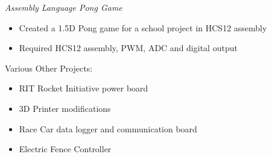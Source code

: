 \documentclass[line,mmmargin]{res}
\begin{document}
\begin{resume}
	\vspace{-10pt}
	{\sl Assembly Language Pong Game}
		\begin{itemize} \itemsep -2pt
			\item Created a 1.5D Pong game for a school project in HCS12 assembly
			\item Required HCS12 assembly, PWM, ADC and digital output
		\end{itemize}
	\vspace{-10pt}
	{Various Other Projects:}
		\begin{multicols}{2}
			\begin{itemize}
				\itemsep -2pt
				\item[] RIT Rocket Initiative power board
				\item[] 3D Printer modifications
				\item[] Race Car data logger and communication board
				\item[] Electric Fence Controller
			\end{itemize}
		\end{multicols}


\end{resume}
\end{document}
